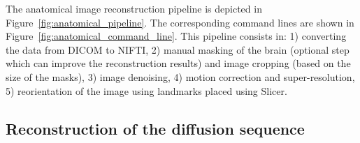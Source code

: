   \begin{figure*}[!h]
   \caption{Overview of the processing pipeline for anatomical data in BTK. Slicer3D (www.slicer.org) is used to convert the DICOM data to NIFTI format and for the placement of landmarks on which is based the reorientation of the 3D reconstructed image. The use of Slicer for these steps allows the user to check the orientation consistency between the three anatomical images (axial, coronal, sagittal for instance). ITKSNAP (www.itksnap.org) is used to create a rough mask of the brain (this step is optional).}
   \label{fig:anatomical_pipeline}
 \end{figure*}

  \begin{figure*}[!h]
   \caption{Command lines corresponding to the processing pipeline for anatomical data in BTK. On the left are shown the blocks used in the anatomical data pipeline (Figure~\ref{fig:anatomical_pipeline}) and on the right the correspond command lines.}
   \label{fig:anatomical_command_line}
 \end{figure*}
 

The anatomical image reconstruction pipeline is depicted in Figure~\ref{fig:anatomical_pipeline}. The corresponding command lines are shown in Figure~\ref{fig:anatomical_command_line}. This pipeline consists in: 1) converting the data from DICOM to NIFTI, 2) manual masking of the brain (optional step which can improve the reconstruction results) and image cropping (based on the size of the masks), 3) image denoising, 4) motion correction and super-resolution, 5) reorientation of the image using landmarks placed using Slicer. 

\subsection{Reconstruction of the diffusion sequence}

